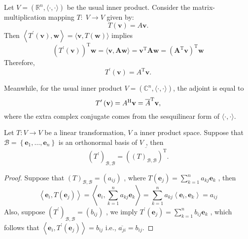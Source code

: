 \begin{example} Let \(V = ({\mathbb{R}}^{n},\langle  \cdot  , \cdot  \rangle)\) be the usual inner product. Consider the matrix-multiplication mapping \(T : \;V \rightarrow  V\) given by:
\[
T\left( \mathbf{v}\right)  = A\mathbf{v}.
\]
Then \(\left\langle  {{T}^{\prime }\left( \mathbf{v}\right) ,\mathbf{w}}\right\rangle   = \langle \mathbf{v},T\left( \mathbf{w}\right) \rangle\) implies
\[
{\left( {T}^{\prime }\left( \mathbf{v}\right) \right) }^{\mathrm{T}}\mathbf{w} = \langle \mathbf{v},\mathbf{A}\mathbf{w}\rangle
= {\mathbf{v}}^{\mathrm{T}}\mathbf{A}\mathbf{w}
= {\left( {\mathbf{A}}^{\mathrm{T}}\mathbf{v}\right) }^{\mathrm{T}}\mathbf{w}
\]
Therefore, 
\[{T}^{\prime }\left( \mathbf{v}\right)  = {A}^{\mathrm{T}}\mathbf{v}.\]

Meanwhile, for the usual inner product \(V = ({\mathbb{C}}^{n},\langle  \cdot  , \cdot  \rangle)\), the adjoint is equal to
\[{T}^{\prime }\left( \mathbf{v}\right)  = {A}^{\mathrm{H}}\mathbf{v} = \overline{A}^{\mathrm{T}}{\bf v},\]
where the extra complex conjugate comes from the sesquilinear form of $\langle  \cdot  , \cdot  \rangle$.
\end{example}

\begin{proposition} \label{prop:adjoint_matrix} Let \(T : V \rightarrow  V\) be a linear transformation, \(V\) a inner product space. Suppose that \(\mathcal{B} = \left\{  {{\mathbf{e}}_{1},\ldots ,{\mathbf{e}}_{n}}\right\}\) is an orthonormal basis of \(V\) , then
\[
{\left( {T}^{\prime }\right) }_{\mathcal{B},\mathcal{B}} = \overline{{\left( {\left( T\right) }_{\mathcal{B},\mathcal{B}}\right) }^{\mathrm{T}}}.
\]
\end{proposition}

\begin{proof} Suppose that \({\left( T\right) }_{\mathcal{B},\mathcal{B}} = \left( {a}_{ij}\right)\) , where \(T\left( {\mathbf{e}}_{j}\right)  = \mathop{\sum }\limits_{{k = 1}}^{n}{a}_{kj}{\mathbf{e}}_{k}\) , then
\[
\left\langle  {{\mathbf{e}}_{i},T\left( {\mathbf{e}}_{j}\right) }\right\rangle   = \left\langle  {{\mathbf{e}}_{i},\mathop{\sum }\limits_{{k = 1}}^{n}{a}_{kj}{\mathbf{e}}_{k}}\right\rangle
= \mathop{\sum }\limits_{{k = 1}}^{n}{a}_{kj}\left\langle  {{\mathbf{e}}_{i},{\mathbf{e}}_{k}}\right\rangle
= {a}_{ij}
\]
Also, suppose \({\left( {T}^{\prime }\right) }_{\mathcal{B},\mathcal{B}} = \left( {b}_{ij}\right)\) , we imply \({T}^{\prime }\left( {\mathbf{e}}_{j}\right)  = \mathop{\sum }\limits_{{k = 1}}^{n}{b}_{ij}{\mathbf{e}}_{k}\) , which follows that
\(
\left\langle  {{\mathbf{e}}_{i},{T}^{\prime }\left( {\mathbf{e}}_{j}\right) }\right\rangle   = {b}_{ij}
\)
i.e., \(\overline{{a}_{ji}} = {b}_{ij}\).
\end{proof}

